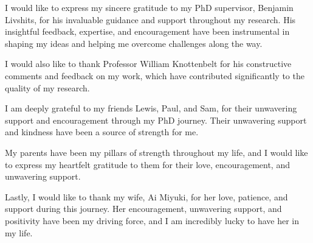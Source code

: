 \cleardoublepage

\begin{acknowledgements}
I would like to express my sincere gratitude to my PhD supervisor, Benjamin Livshits, for his invaluable guidance and support throughout my research. His insightful feedback, expertise, and encouragement have been instrumental in shaping my ideas and helping me overcome challenges along the way.

I would also like to thank Professor William Knottenbelt for his constructive comments and feedback on my work, which have contributed significantly to the quality of my research.

I am deeply grateful to my friends Lewis, Paul, and Sam, for their unwavering support and encouragement through my PhD journey.
Their unwavering support and kindness have been a source of strength for me.

My parents have been my pillars of strength throughout my life, and I would like to express my heartfelt gratitude to them for their love, encouragement, and unwavering support.

Lastly, I would like to thank my wife, Ai Miyuki, for her love, patience, and support during this journey.
Her encouragement, unwavering support, and positivity have been my driving force, and I am incredibly lucky to have her in my life.

\end{acknowledgements}
